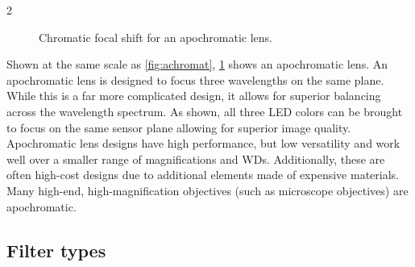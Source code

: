 \documentclass[10pt]{article}
\begin{document}
\begin{multicols}{2}
\begin{figure}[H]
    \caption{Chromatic focal shift for an apochromatic lens.}
    \label{fig:apochromat}
\end{figure}
Shown at the same scale as \ref{fig:achromat}, \ref{fig:apochromat} shows an apochromatic lens. An apochromatic lens is designed to focus three wavelengths on the same plane. While this is a far more complicated design, it allows for superior balancing across the wavelength spectrum. As shown, all three LED colors can be brought to focus on the same sensor plane allowing for superior image quality. Apochromatic lens designs have high performance, but low versatility and work well over a smaller range of magnifications and WDs. Additionally, these are often high-cost designs due to additional elements made of expensive materials. Many high-end, high-magnification objectives (such as microscope objectives) are apochromatic.

\subsection{Filter types}

\end{multicols}
\end{document}
